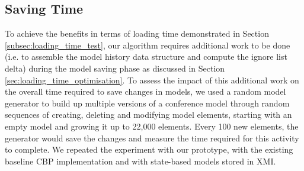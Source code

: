 \documentclass{llncs}
\begin{document}
\subsection{Saving Time}
\label{subsec:saving_time_test}

To achieve the benefits in terms of loading time demonstrated in Section \ref{subsec:loading_time_test}, our algorithm requires additional work to be done (i.e. to assemble the model history data structure and compute the ignore list delta) during the model saving phase as discussed in Section \ref{sec:loading_time_optimisation}. To assess the impact of this additional work on the overall time required to save changes in models, we used a random model generator to build up multiple versions of a conference model through random sequences of creating, deleting and modifying model elements, starting with an empty model and growing it up to 22,000 elements. Every 100 new elements, the generator would save the changes and measure the time required for this activity to complete. We repeated the experiment with our prototype, with the existing baseline CBP implementation and with state-based models stored in XMI.
\end{document}
